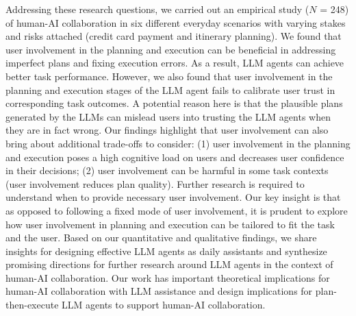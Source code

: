 Addressing these research questions, we carried out an empirical
study ($N$ = 248) of human-AI collaboration in six different everyday scenarios with varying stakes and risks attached (\eg credit card payment and itinerary planning). 
We found that user involvement in the planning and execution can be beneficial in addressing imperfect plans and fixing execution errors. 
As a result, LLM agents can achieve better task performance. %
However, we also found that user involvement in the planning and execution stages of the LLM agent fails to calibrate user trust in corresponding task outcomes. 
{A potential reason here is that the plausible plans generated by the LLMs can mislead users into trusting the LLM agents when they are in fact wrong.} 
Our findings highlight that user involvement can also bring about additional trade-offs to consider: %
(1) user involvement in the planning and execution poses a high cognitive load on users and decreases user confidence in their decisions; (2) user involvement can be harmful in some task contexts (\eg user involvement reduces plan quality). 
Further research is required to understand when to provide necessary user involvement.
%
Our key insight is that as opposed to following a fixed mode of user involvement, it is prudent to explore how user involvement in planning and execution can be tailored to fit the task and the user. %
Based on our quantitative and qualitative findings, %
we share insights for designing effective LLM agents as daily assistants and synthesize promising directions for further research around LLM agents in the context of human-AI collaboration. 
Our work has important theoretical implications for human-AI collaboration with LLM assistance and design implications for plan-then-execute LLM agents to support human-AI collaboration.